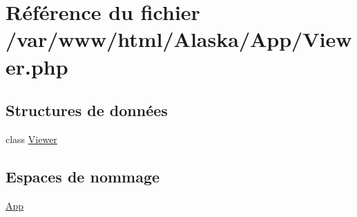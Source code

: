 \hypertarget{_viewer_8php}{}\section{Référence du fichier /var/www/html/\+Alaska/\+App/\+Viewer.php}
\label{_viewer_8php}
\subsection*{Structures de données}
\begin{DoxyCompactItemize}
\item 
class \hyperlink{class_app_1_1_viewer}{Viewer}
\end{DoxyCompactItemize}
\subsection*{Espaces de nommage}
\begin{DoxyCompactItemize}
\item 
 \hyperlink{namespace_app}{App}
\end{DoxyCompactItemize}
